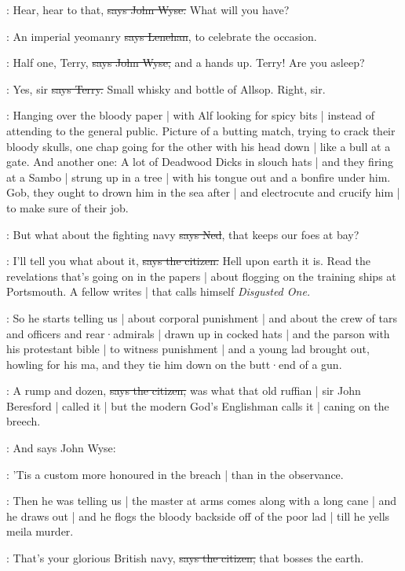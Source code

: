 \johnwyse:
Hear,
hear to that,
\sout{says John Wyse.}
What will you have?

\lenehan:
An imperial yeomanry
\sout{says Lenehan},
to celebrate the occasion.

\johnwyse:
Half one,
Terry,
\sout{says John Wyse,}
and a hands up.
Terry!
Are you asleep?

\terry:
Yes,
sir
\sout{says Terry.}
Small whisky and bottle of Allsop.
Right,
sir.

\Nq:
Hanging over the bloody paper |
with Alf looking for spicy bits |
instead of attending to the general public.
Picture of a butting match,
trying to crack their bloody skulls,
one chap going for the other with his head down |
like a bull at a gate.
And another one:
A lot of Deadwood Dicks in slouch hats |
and they firing at a Sambo |
strung up in a tree |
with his tongue out and a bonfire under him.
Gob,
they ought to drown him in the sea after |
and electrocute and crucify him |
to make sure of their job.

\lambert:
But what about the fighting navy
\sout{says Ned},
that keeps our foes at bay?

\citizen:
I'll tell you what about it,
\sout{says the citizen.}
Hell upon earth it is.
Read the revelations that's going on in the papers |
about flogging on the training ships at Portsmouth.
A fellow writes |
that calls himself \emph{Disgusted One.}

\Nq:
So he starts telling us |
about corporal punishment |
and about the crew of tars and officers and rear·admirals |
drawn up in cocked hats |
and the parson with his protestant bible |
to witness punishment |
and a young lad brought out,
howling for his ma,
and they tie him down on the butt·end of a gun.

\citizen:
A rump and dozen,
\sout{says the citizen,}
was what that old ruffian |
sir John Beresford |
called it |
but the modern God's Englishman calls it |
caning on the breech.%

\Nq:
And says John Wyse:

\johnwyse:
'Tis a custom more honoured in the breach |
than in the observance.

\Nq:
Then he was telling us |
the master at arms
comes along with a long cane |
and he draws out |
and he flogs the bloody backside off of the poor lad |
till he yells meila murder.

\citizen:
That's your glorious British navy,
\sout{says the citizen,}
that bosses the earth.

